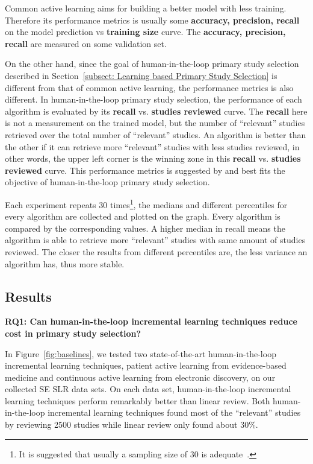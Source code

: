 \documentclass[final,twocolumn,5p]{elsarticle}
\theoremstyle{break}
\begin{document}
Common active learning aims for building a better model with less training. Therefore its performance metrics is usually some \textbf{accuracy, precision, recall} on the model prediction vs \textbf{training size} curve. The \textbf{accuracy, precision, recall} are measured on some validation set.

On the other hand, since the goal of human-in-the-loop primary study selection described in Section~\ref{subsect: Learning based Primary Study Selection} is different from that of common active learning, the performance metrics is also different. In human-in-the-loop primary study selection, the performance of each algorithm is evaluated by its \textbf{recall} vs. \textbf{studies reviewed} curve. The \textbf{recall} here is not a measurement on the trained model, but the number of ``relevant'' studies retrieved over the total number of ``relevant'' studies. An algorithm is better than the other if it can retrieve more ``relevant'' studies with less studies reviewed, in other words, the upper left corner is the winning zone in this \textbf{recall} vs. \textbf{studies reviewed} curve. This performance metrics is suggested by \cite{cormack2015autonomy,cormack2014evaluation,tredennick2015} and best fits the objective of human-in-the-loop primary study selection.

Each experiment repeats $30$ times\footnote{It is suggested that usually a sampling size of $30$ is adequate~\cite{isotalo2001basics}.}, the medians and different percentiles for every algorithm are collected and plotted on the graph. Every algorithm is compared by the corresponding values. A higher median in recall means the algorithm is able to retrieve more ``relevant'' studies with same amount of studies reviewed. The closer the results from different percentiles are, the less variance an algorithm has, thus more stable.





\subsection{Results}
\label{subsect: Results}


{\bf RQ1: Can human-in-the-loop incremental learning techniques reduce cost in primary study selection?} 

In Figure~\ref{fig:baselines}, we tested two state-of-the-art human-in-the-loop incremental learning techniques, patient active learning
from evidence-based medicine and continuous active learning from electronic
discovery, on our collected SE SLR data sets. On each data set, human-in-the-loop incremental learning techniques perform remarkably better than linear review. Both human-in-the-loop incremental learning techniques found most of the ``relevant'' studies by reviewing 2500 studies while linear review only found about $30\%$.
\end{document}
